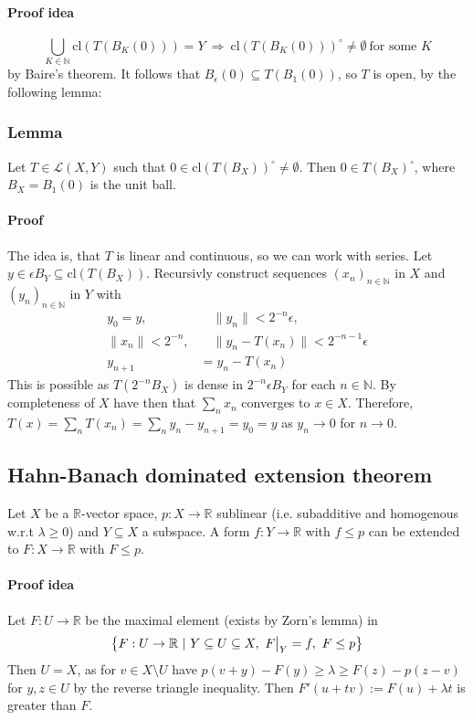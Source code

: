 \documentclass{scrartcl}
\newcommand{\R}{\mathbb{R}}
\newcommand{\N}{\mathbb{N}}
\newcommand\restr[2]{{
    \left.\kern-\nulldelimiterspace
    #1
    \vphantom{\big|}
    \right|_{#2}
}}
\begin{document}
\paragraph{Proof idea}
\begin{equation}
    \bigcup_{K \in \N} \mathrm{cl}\left(T(B_K(0))\right) = Y \ \Rightarrow \ \mathrm{cl}\left(T(B_K(0))\right)^\circ \neq \emptyset \ \text{for some } K\nonumber
\end{equation}
by Baire's theorem. It follows that $B_\epsilon(0) \subseteq T(B_1(0))$, so $T$ is open, by the following lemma:
\subsubsection{Lemma}
\label{closure_image_unit_ball}
Let $T \in \mathcal{L}(X, Y)$ such that $0 \in \mathrm{cl}(T(B_X))^\circ \neq \emptyset$. Then $0 \in T(B_X)^\circ$, where $B_X = B_1(0)$ is the unit ball.
\paragraph{Proof} The idea is, that $T$ is linear and continuous, so we can work with series. Let $y \in \epsilon B_Y \subseteq \mathrm{cl}(T(B_X))$. Recursivly construct sequences $(x_n)_{n \in \N}$ in $X$ and $(y_n)_{n \in \N}$ in $Y$ with
\begin{align*}
    y_0 = y, &\quad \| y_n \| < 2^{-n}\epsilon, \\
    \| x_n \| < 2^{-n}, &\quad \| y_n - T(x_n) \| < 2^{-n-1} \epsilon \\
    y_{n + 1} &= y_n - T(x_n)
\end{align*}
This is possible as $T(2^{-n}B_X)$ is dense in $2^{-n}\epsilon B_Y$ for each $n \in \N$. By completeness of $X$ have then that $\sum_n x_n$ converges to $x \in X$. Therefore, $T(x) = \sum_n T(x_n) = \sum_n y_n - y_{n + 1} = y_0 = y$ as $y_n \to 0$ for $n \to 0$.

\subsection{Hahn-Banach dominated extension theorem}
Let $X$ be a $\R$-vector space, $p: X \to \R$ sublinear (i.e. subadditive and homogenous w.r.t $\lambda \geq 0$) and $Y \subseteq X$ a subspace. A form $f: Y \to \R$ with $f \leq p$ can be extended to $F: X \to \R$ with $F \leq p$.
\paragraph{Proof idea} Let $F: U \to \R$ be the maximal element (exists by Zorn's lemma) in \begin{equation}
    \left\{ F: U \to \R \ | \ Y \subseteq U \subseteq X, \ \restr{F}{Y} = f, \ F \leq p \right\}  \nonumber
\end{equation}
Then $U = X$, as for $v \in X \setminus U$ have $p(v + y) - F(y) \geq \lambda \geq F(z) - p(z - v)$ for $y, z \in U$ by the reverse triangle inequality. Then $F'(u + tv) := F(u) + \lambda t$ is greater than $F$.
\end{document}
